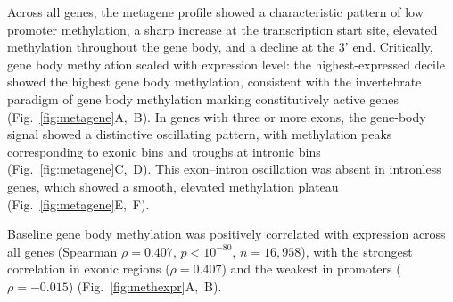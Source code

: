 \documentclass[12pt]{article}
\begin{document}
Across all genes, the metagene profile showed a characteristic pattern of low promoter methylation, a sharp increase at the transcription start site, elevated methylation throughout the gene body, and a decline at the 3' end. Critically, gene body methylation scaled with expression level: the highest-expressed decile showed the highest gene body methylation, consistent with the invertebrate paradigm of gene body methylation marking constitutively active genes (Fig.~\ref{fig:metagene}A,~B). In genes with three or more exons, the gene-body signal showed a distinctive oscillating pattern, with methylation peaks corresponding to exonic bins and troughs at intronic bins (Fig.~\ref{fig:metagene}C,~D). This exon--intron oscillation was absent in intronless genes, which showed a smooth, elevated methylation plateau (Fig.~\ref{fig:metagene}E,~F).

Baseline gene body methylation was positively correlated with expression across all genes (Spearman $\rho = 0.407$, $p < 10^{-80}$, $n = 16{,}958$), with the strongest correlation in exonic regions ($\rho = 0.407$) and the weakest in promoters ($\rho = -0.015$) (Fig.~\ref{fig:methexpr}A,~B).
\end{document}
